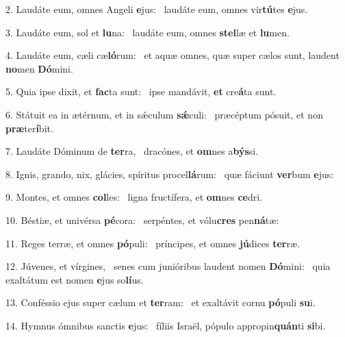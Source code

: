 2. Laudáte eum, omnes Angeli \textbf{e}jus: \ast\  laudáte eum, omnes vir\textbf{tú}tes \textbf{e}jus.\

3. Laudáte eum, sol et \textbf{lu}na: \ast\  laudáte eum, omnes \textbf{stel}læ et \textbf{lu}men.\

4. Laudáte eum, cæli cæ\textbf{ló}rum: \ast\  et aquæ omnes, quæ super cælos sunt, laudent \textbf{no}men \textbf{Dó}mini.\

5. Quia ipse dixit, et \textbf{fac}ta sunt: \ast\  ipse mandávit, \textbf{et} cre\textbf{á}ta sunt.\

6. Státuit ea in ætérnum, et in sǽculum \textbf{sǽ}culi: \ast\  præcéptum pósuit, et non \textbf{præ}ter\textbf{í}bit.\

7. Laudáte Dóminum de \textbf{ter}ra, \ast\  dracónes, et \textbf{om}nes a\textbf{býs}si.\

8. Ignis, grando, nix, glácies, spíritus procel\textbf{lá}rum: \ast\  quæ fáciunt \textbf{ver}bum \textbf{e}jus:\

9. Montes, et omnes \textbf{col}les: \ast\  ligna fructífera, et \textbf{om}nes \textbf{ce}dri.\

10. Béstiæ, et univérsa \textbf{pé}cora: \ast\  serpéntes, et vólu\textbf{cres} pen\textbf{ná}tæ:\

11. Reges terræ, et omnes \textbf{pó}puli: \ast\  príncipes, et omnes \textbf{jú}dices \textbf{ter}ræ.\

12. Júvenes, et vírgines, \dag\  senes cum junióribus laudent nomen \textbf{Dó}mini: \ast\  quia exaltátum est nomen \textbf{e}jus so\textbf{lí}us.\

13. Conféssio ejus super cælum et \textbf{ter}ram: \ast\  et exaltávit cornu \textbf{pó}puli \textbf{su}i.\

14. Hymnus ómnibus sanctis \textbf{e}jus: \ast\  fíliis Israël, pópulo appropin\textbf{quán}ti \textbf{si}bi.\

